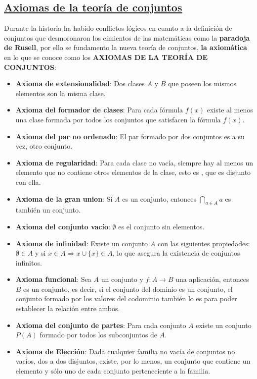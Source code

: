 \documentclass[10pt,a4paper,openright]{book}
\begin{document}
\subsection*{\underline{Axiomas de la teoría de conjuntos}}
Durante la historia ha habido conflictos lógicos en cuanto a la definición de conjuntos que desmoronaron los cimientos de las matemáticas como la \textbf{paradoja de Rusell}, por ello se fundamento la nueva teoría de conjuntos, \textbf{la axiomática} en lo que se conoce como los \textbf{AXIOMAS DE LA TEORÍA DE CONJUNTOS}:
\begin{itemize}
\item \textbf{Axioma de extensionalidad}: Dos clases $A$ y $B$ que poseen los mismos elementos son la misma clase.

\item \textbf{Axioma del formador de clases}: Para cada fórmula $f(x)$ existe al menos una clase formada por todos los conjuntos que satisfacen la fórmula $f(x)$.

\item \textbf{Axioma del par no ordenado}: El par formado por dos conjuntos es a su vez, otro conjunto.

\item \textbf{Axioma de regularidad}: Para cada clase no vacía, siempre hay al menos un elemento que no contiene otros elementos de la clase, esto es , que es disjunto con ella.

\item \textbf{Axioma de la gran union}: Si $A$ es un conjunto, entonces $\bigcap_{a\in A} a$ es también un conjunto.

\item \textbf{Axioma del conjunto vacío}: $\emptyset$ es el conjunto sin elementos.

\item \textbf{Axioma de infinidad}: Existe un conjunto $A$ con las siguientes propiedades: $\emptyset\in A$ y si $x\in A\Rightarrow x\cup \{x\}\in A$, lo que asegura la existencia de conjuntos infinitos.

\item \textbf{Axioma funcional}: Sea $A$ un conjunto y $f: A\rightarrow B$ una aplicación, entonces $B$ es un conjunto, es decir, si el conjunto del dominio es un conjunto, el conjunto formado por los valores del codominio también lo es para poder establecer la relación entre ambos.

\item \textbf{Axioma del conjunto de partes}: Para cada conjunto $A$ existe un conjunto $P(A)$ formado por todos los subconjuntos de $A$.

\item \textbf{Axioma de Elección}: Dada cualquier familia no vacía de conjuntos no vacíos, dos a dos disjuntos, existe, por lo menos, un conjunto que contiene un elemento y sólo uno de cada conjunto perteneciente a la familia.
\end{itemize}
\end{document}
